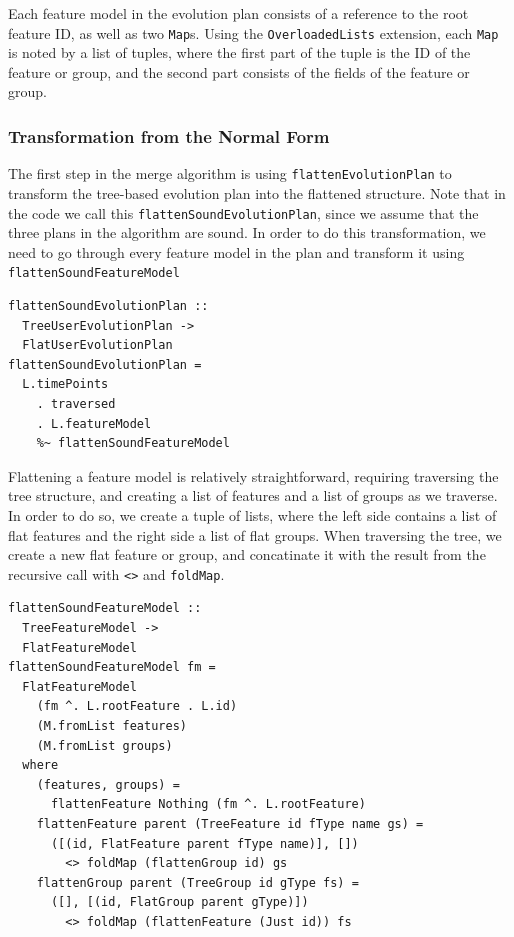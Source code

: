 \documentclass[a4paper,english]{ifimaster}
\begin{document}
Each feature model in the evolution plan consists of a reference to the root feature ID, as well as two \texttt{Map}s. Using the \texttt{OverloadedLists} extension, each \texttt{Map} is noted by a list of tuples, where the first part of the tuple is the ID of the feature or group, and the second part consists of the fields of the feature or group.

\subsubsection{Transformation from the Normal Form}%
\label{ssub:transformation_from_the_normal_form}

The first step in the merge algorithm is using \texttt{flatten\-Evolution\-Plan} to transform the tree-based evolution plan into the flattened structure. Note that in the code we call this \texttt{flatten\-Sound\-Evolution\-Plan}, since we assume that the three plans in the algorithm are sound. In order to do this transformation, we need to go through every feature model in the plan and transform it using \texttt{flatten\-Sound\-Feature\-Model}

\begin{verbatim}
flattenSoundEvolutionPlan :: 
  TreeUserEvolutionPlan -> 
  FlatUserEvolutionPlan
flattenSoundEvolutionPlan =
  L.timePoints
    . traversed
    . L.featureModel
    %~ flattenSoundFeatureModel
\end{verbatim}

Flattening a feature model is relatively straightforward, requiring traversing the tree structure, and creating a list of features and a list of groups as we traverse. In order to do so, we create a tuple of lists, where the left side contains a list of flat features and the right side a list of flat groups. When traversing the tree, we create a new flat feature or group, and concatinate it with the result from the recursive call with \texttt{<>} and \texttt{foldMap}.

\begin{verbatim}
flattenSoundFeatureModel :: 
  TreeFeatureModel -> 
  FlatFeatureModel
flattenSoundFeatureModel fm =
  FlatFeatureModel
    (fm ^. L.rootFeature . L.id)
    (M.fromList features)
    (M.fromList groups)
  where
    (features, groups) = 
      flattenFeature Nothing (fm ^. L.rootFeature)
    flattenFeature parent (TreeFeature id fType name gs) =
      ([(id, FlatFeature parent fType name)], [])
        <> foldMap (flattenGroup id) gs
    flattenGroup parent (TreeGroup id gType fs) =
      ([], [(id, FlatGroup parent gType)])
        <> foldMap (flattenFeature (Just id)) fs
\end{verbatim}
\end{document}
